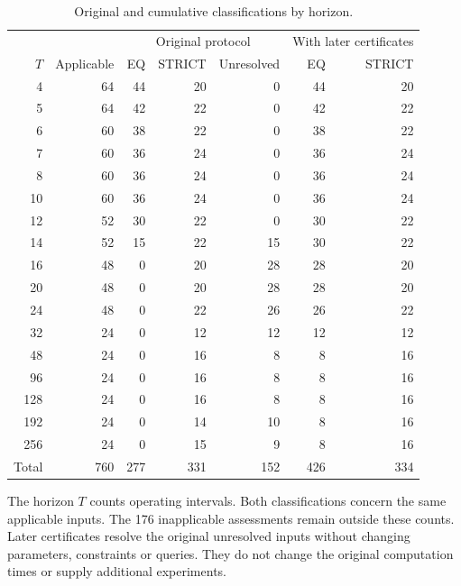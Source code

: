 \begin{table}[htbp]

\caption{Original and cumulative classifications by horizon.}
\label{tab:si_horizon_followup}

\begin{tabular}{@{}rrrrrrr@{}}
\toprule
 & & \multicolumn{3}{c}{Original protocol} & \multicolumn{2}{c}{With later certificates}\\

$T$ & Applicable & EQ & STRICT & Unresolved & EQ & STRICT\\
\midrule
4 & 64 & 44 & 20 & 0 & 44 & 20\\
5 & 64 & 42 & 22 & 0 & 42 & 22\\
6 & 60 & 38 & 22 & 0 & 38 & 22\\
7 & 60 & 36 & 24 & 0 & 36 & 24\\
8 & 60 & 36 & 24 & 0 & 36 & 24\\
10 & 60 & 36 & 24 & 0 & 36 & 24\\
12 & 52 & 30 & 22 & 0 & 30 & 22\\
14 & 52 & 15 & 22 & 15 & 30 & 22\\
16 & 48 & 0 & 20 & 28 & 28 & 20\\
20 & 48 & 0 & 20 & 28 & 28 & 20\\
24 & 48 & 0 & 22 & 26 & 26 & 22\\
32 & 24 & 0 & 12 & 12 & 12 & 12\\
48 & 24 & 0 & 16 & 8 & 8 & 16\\
96 & 24 & 0 & 16 & 8 & 8 & 16\\
128 & 24 & 0 & 16 & 8 & 8 & 16\\
192 & 24 & 0 & 14 & 10 & 8 & 16\\
256 & 24 & 0 & 15 & 9 & 8 & 16\\
\midrule
Total & 760 & 277 & 331 & 152 & 426 & 334\\
\bottomrule
\end{tabular}

\smallskip
\begin{minipage}{\linewidth}
The horizon $T$ counts operating intervals. Both classifications concern
the same applicable inputs. The 176 inapplicable assessments remain outside
these counts. Later certificates resolve the original unresolved inputs
without changing parameters, constraints or queries. They do not change
the original computation times or supply additional experiments.
\end{minipage}
\end{table}



